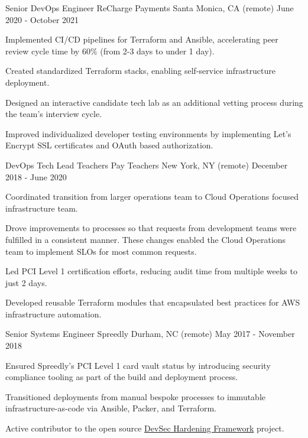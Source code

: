 \begin{cventries}
  \cventry
  {Senior DevOps Engineer} %
  {ReCharge Payments} %
  {Santa Monica, CA (remote)} %
  {June 2020 - October 2021} %
  { 
    \begin{cvitems} %
      \item {Implemented CI/CD pipelines for Terraform and Ansible, accelerating peer review cycle time by 60\% (from 2-3 days to under 1 day).}
      \item {Created standardized Terraform stacks, enabling self-service infrastructure deployment.}
      \item {Designed an interactive candidate tech lab as an additional vetting process during the team's interview cycle.}
      \item {Improved individualized developer testing environments by implementing Let's Encrypt SSL certificates and OAuth based authorization.}
    \end{cvitems}
  }

  \cventry
    {DevOps Tech Lead} %
    {Teachers Pay Teachers} %
    {New York, NY (remote)} %
    {December 2018 - June 2020} %
    {
      \begin{cvitems} %
        \item {Coordinated transition from larger operations team to Cloud Operations focused infrastructure team.}
        \item {Drove improvements to processes so that requests from development teams were fulfilled in a consistent manner. These changes enabled the Cloud Operations team to implement SLOs for most common requests.}
        \item {Led PCI Level 1 certification efforts, reducing audit time from multiple weeks to just 2 days.}
        \item {Developed reusable Terraform modules that encapsulated best practices for AWS infrastructure automation.}
      \end{cvitems}
    }

  \cventry
    {Senior Systems Engineer} %
    {Spreedly} %
    {Durham, NC (remote)} %
    {May 2017 - November 2018} %
    {
      \begin{cvitems}
        \item {Ensured Spreedly's PCI Level 1 card vault status by introducing security compliance tooling as part of the build and deployment process.}
        \item {Transitioned deployments from manual bespoke processes to immutable infrastructure-as-code via Ansible, Packer, and Terraform.}
        \item {Active contributor to the open source \href{https://github.com/dev-sec}{DevSec Hardening Framework} project.}
      \end{cvitems}
    }


\end{cventries}
